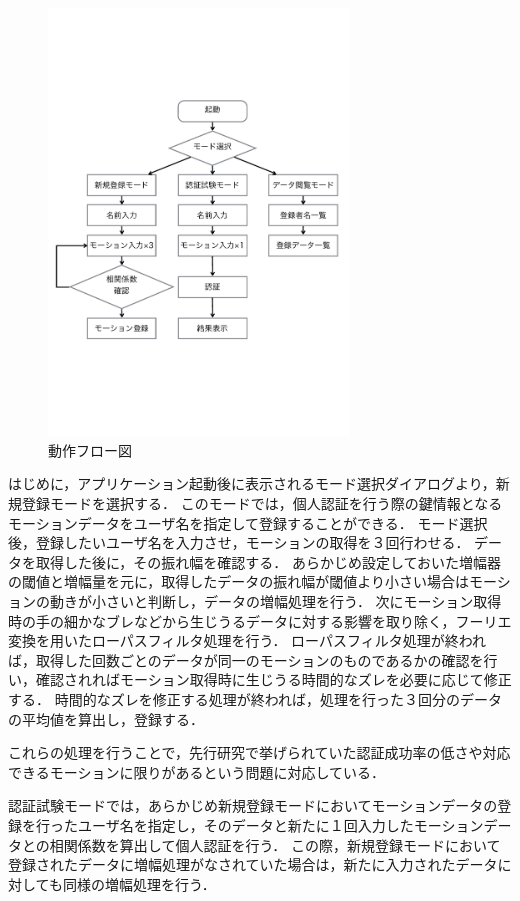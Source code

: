 \documentclass[11pt]{jarticle}
\begin{document}
\begin{figure}
    \begin{center}
        \includegraphics[width=80mm, bb=0 183 590 670]{Flow.pdf}
        \caption{動作フロー図}
        \label{flow}
    \end{center}
\end{figure}

はじめに，アプリケーション起動後に表示されるモード選択ダイアログより，新規登録モードを選択する．
このモードでは，個人認証を行う際の鍵情報となるモーションデータをユーザ名を指定して登録することができる．
モード選択後，登録したいユーザ名を入力させ，モーションの取得を３回行わせる．
データを取得した後に，その振れ幅を確認する．
あらかじめ設定しておいた増幅器の閾値と増幅量を元に，取得したデータの振れ幅が閾値より小さい場合はモーションの動きが小さいと判断し，データの増幅処理を行う．
次にモーション取得時の手の細かなブレなどから生じうるデータに対する影響を取り除く，フーリエ変換を用いたローパスフィルタ処理を行う．
ローパスフィルタ処理が終われば，取得した回数ごとのデータが同一のモーションのものであるかの確認を行い，確認されればモーション取得時に生じうる時間的なズレを必要に応じて修正する．
時間的なズレを修正する処理が終われば，処理を行った３回分のデータの平均値を算出し，登録する．

これらの処理を行うことで，先行研究で挙げられていた認証成功率の低さや対応できるモーションに限りがあるという問題に対応している．

認証試験モードでは，あらかじめ新規登録モードにおいてモーションデータの登録を行ったユーザ名を指定し，そのデータと新たに１回入力したモーションデータとの相関係数を算出して個人認証を行う．
この際，新規登録モードにおいて登録されたデータに増幅処理がなされていた場合は，新たに入力されたデータに対しても同様の増幅処理を行う．
\end{document}
